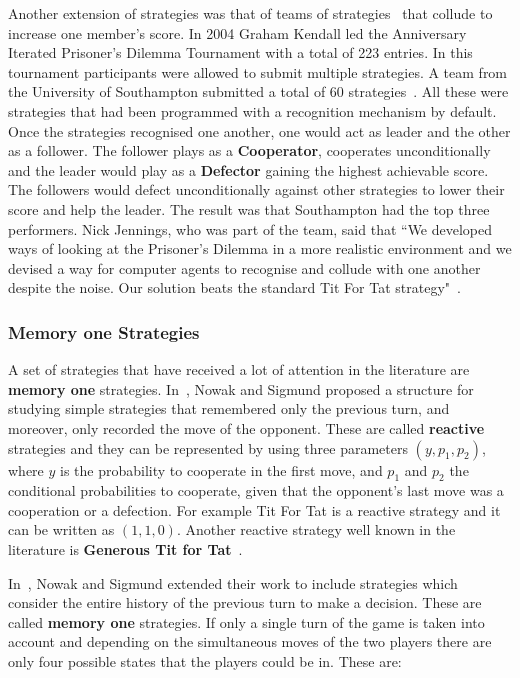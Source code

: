 \documentclass{article}
\theoremstyle{definition}
\begin{document}
Another extension of strategies was that of teams of
strategies~\cite{J.P.Delahaye1993Lp, J.P.Delahaye1995LIeP, A.Rogers2007Ctpw}
that collude to increase one member's score. In 2004 Graham Kendall led the
Anniversary Iterated Prisoner's Dilemma Tournament with a total of 223 entries.
In this tournament participants were allowed to submit multiple strategies. A
team from the University of Southampton submitted a total of 60
strategies~\cite{A.Rogers2007Ctpw}. All these were strategies that had been
programmed with a recognition mechanism by default. Once the strategies
recognised one another, one would act as leader and the other as a follower. The
follower plays as a \textbf{Cooperator}, cooperates unconditionally and the
leader would play as a \textbf{Defector} gaining the highest achievable score.
The followers would defect unconditionally against other strategies to lower
their score and help the leader. The result was that Southampton had the top
three performers. Nick Jennings, who was part of the team, said that ``We
developed ways of looking at the Prisoner's Dilemma in a more realistic
environment and we devised a way for computer agents to recognise and collude
with one another despite the noise. Our solution beats the standard Tit For Tat
strategy"~\cite{southampton_blog}.

\subsubsection{Memory one Strategies}\label{subsection:memory_one}

A set of strategies that have received a lot of attention in
the literature are \textbf{memory one} strategies. In~\cite{nowak1989},
Nowak and Sigmund proposed a structure for studying simple strategies that
remembered only the previous turn, and moreover, only recorded the move of the
opponent. These are called \textbf{reactive} strategies and they can be
represented by using three parameters \((y, p_1, p_2)\), where \(y\) is the
probability to cooperate in the first move, and \(p_1\) and \(p_2\) the
conditional probabilities to cooperate, given that the opponent's last move was
a cooperation or a defection. For example Tit For Tat is a reactive strategy and
it can be written as \((1, 1, 0)\). Another reactive strategy well known in
the literature is \textbf{Generous Tit for Tat}~\cite{Nowak1992}.

In~\cite{Nowak1990}, Nowak and Sigmund extended
their work to include strategies which consider the entire history of the previous turn to make a decision.
These are called \textbf{memory one} strategies.
If only a single turn of the game is taken into account and depending on the
simultaneous moves of the two players there are only four possible states that
the players could be in. These are:
\end{document}
